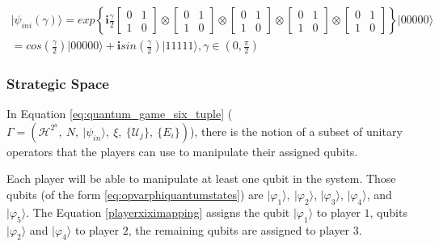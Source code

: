 \begin{center}
\begin{equation}
\begin{split}
\vert\psi_{ini}(\gamma)\rangle=exp\left\{ \mathbf{i}\frac{\gamma}{2}\left[\begin{array}{cc}
0 & 1\\
1 & 0
\end{array}\right]\otimes\left[\begin{array}{cc}
0 & 1\\
1 & 0
\end{array}\right]\otimes\left[\begin{array}{cc}
0 & 1\\
1 & 0
\end{array}\right]\otimes\left[\begin{array}{cc}
0 & 1\\
1 & 0
\end{array}\right]\otimes\left[\begin{array}{cc}
0 & 1\\
1 & 0
\end{array}\right]\right\} \vert00000\rangle \\
=cos(\frac{\gamma}{2})\vert00000\rangle+\mathbf{i}sin(\frac{\gamma}{2})\vert11111\rangle,\gamma\in(0,\frac{\pi}{2})
\end{split}
\label{eq:estado_inicial_pg}
\end{equation}
\end{center}



\subsubsection{Strategic Space}
\label{subsec:strategic_space}

In Equation \ref{eq:quantum_game_six_tuple} ($\Gamma=(\mathcal{H}^{2^{a}},\: N,\:\vert\psi_{in}\rangle,\:\xi,\:\{\mathcal{U}_{j}\},\:\{E_{i}\})
$), there is the notion of a subset of unitary operators that the players can use to manipulate their assigned qubits.

Each player will be able to manipulate at least one qubit in the system. Those qubits (of the form \ref{eq:opvarphiquantumstates}) are $\vert\varphi_{1}\rangle,\:\vert\varphi_{2}\rangle$, $\vert\varphi_{3}\rangle$, $\vert\varphi_{4}\rangle$, and $\vert\varphi_{5}\rangle$. The Equation \ref{playerxiximapping} assigns the qubit $\vert\varphi_{1}\rangle$ to player $1$, qubits $\vert\varphi_{2}\rangle$ and $\vert\varphi_{4}\rangle$ to player $2$, the remaining qubits are assigned to player $3$. 

